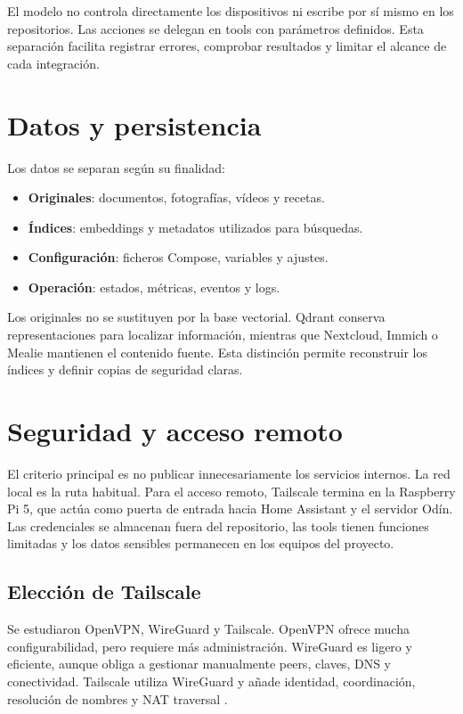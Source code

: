 El modelo no controla directamente los dispositivos ni escribe por sí mismo en
los repositorios. Las acciones se delegan en tools con parámetros definidos.
Esta separación facilita registrar errores, comprobar resultados y limitar el
alcance de cada integración.

\section{Datos y persistencia}
Los datos se separan según su finalidad:

\begin{itemize}
  \item \textbf{Originales}: documentos, fotografías, vídeos y recetas.
  \item \textbf{Índices}: embeddings y metadatos utilizados para búsquedas.
  \item \textbf{Configuración}: ficheros Compose, variables y ajustes.
  \item \textbf{Operación}: estados, métricas, eventos y logs.
\end{itemize}

Los originales no se sustituyen por la base vectorial. Qdrant conserva
representaciones para localizar información, mientras que Nextcloud, Immich o
Mealie mantienen el contenido fuente. Esta distinción permite reconstruir los
índices y definir copias de seguridad claras.

\section{Seguridad y acceso remoto}
El criterio principal es no publicar innecesariamente los servicios internos.
La red local es la ruta habitual. Para el acceso remoto, Tailscale termina en
la Raspberry Pi 5, que actúa como puerta de entrada hacia Home Assistant y el
servidor Odín.
Las credenciales se almacenan fuera del repositorio, las tools tienen funciones
limitadas y los datos sensibles permanecen en los equipos del proyecto.

\subsection{Elección de Tailscale}
Se estudiaron OpenVPN, WireGuard y Tailscale. OpenVPN ofrece mucha
configurabilidad, pero requiere más administración. WireGuard es ligero y
eficiente, aunque obliga a gestionar manualmente peers, claves, DNS y
conectividad. Tailscale utiliza WireGuard y añade identidad, coordinación,
resolución de nombres y NAT traversal \citep{wireguardDocs,tailscaleConcepts}.

